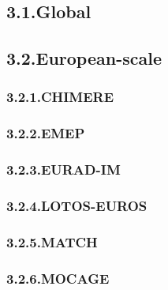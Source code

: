 \documentclass[9pt]{report}
\begin{document}
\subsection{3.1.\hspace*{0.5em}Global}\label{sec-global}%

\subsection{3.2.\hspace*{0.5em}European-scale}\label{sec-european-scale}%

\subsubsection{3.2.1.\hspace*{0.5em}CHIMERE}\label{sec-chimere}%

\subsubsection{3.2.2.\hspace*{0.5em}EMEP}\label{sec-emep}%

\subsubsection{3.2.3.\hspace*{0.5em}EURAD-IM}\label{sec-eurad-im}%

\subsubsection{3.2.4.\hspace*{0.5em}LOTOS-EUROS}\label{sec-lotos-euros}%

\subsubsection{3.2.5.\hspace*{0.5em}MATCH}\label{sec-match}%

\subsubsection{3.2.6.\hspace*{0.5em}MOCAGE}\label{sec-mocage}%
\end{document}
